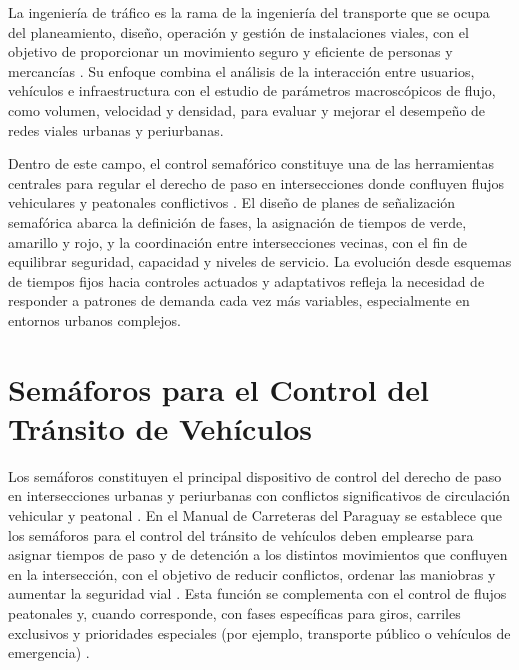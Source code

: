 
\label{sec:traffic_engineering_signals}

La ingeniería de tráfico es la rama de la ingeniería del transporte que se ocupa del planeamiento, diseño, operación y gestión de instalaciones viales, con el objetivo de proporcionar un movimiento seguro y eficiente de personas y mercancías \cite{garber2019traffic,roess2019traffic}. Su enfoque combina el análisis de la interacción entre usuarios, vehículos e infraestructura con el estudio de parámetros macroscópicos de flujo, como volumen, velocidad y densidad, para evaluar y mejorar el desempeño de redes viales urbanas y periurbanas.

Dentro de este campo, el control semafórico constituye una de las herramientas centrales para regular el derecho de paso en intersecciones donde confluyen flujos vehiculares y peatonales conflictivos \cite{garber2019traffic,fhwa2008signal}. El diseño de planes de señalización semafórica abarca la definición de fases, la asignación de tiempos de verde, amarillo y rojo, y la coordinación entre intersecciones vecinas, con el fin de equilibrar seguridad, capacidad y niveles de servicio. La evolución desde esquemas de tiempos fijos hacia controles actuados y adaptativos refleja la necesidad de responder a patrones de demanda cada vez más variables, especialmente en entornos urbanos complejos.

\section{Semáforos para el Control del Tránsito de Vehículos}
\label{subsec:semaforos_control_vehiculos}

Los semáforos constituyen el principal dispositivo de control del derecho de paso en intersecciones urbanas y periurbanas con conflictos significativos de circulación vehicular y peatonal \cite{mopc2019manual}. En el Manual de Carreteras del Paraguay se establece que los semáforos para el control del tránsito de vehículos deben emplearse para asignar tiempos de paso y de detención a los distintos movimientos que confluyen en la intersección, con el objetivo de reducir conflictos, ordenar las maniobras y aumentar la seguridad vial \cite{mopc2019manual}. Esta función se complementa con el control de flujos peatonales y, cuando corresponde, con fases específicas para giros, carriles exclusivos y prioridades especiales (por ejemplo, transporte público o vehículos de emergencia) \cite{mopc2019manual}.

